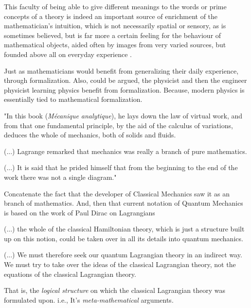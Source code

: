 \documentclass[
12pt,				%
openright,			%
oneside,			%
a4paper,			%
brazil,				%
english,			%
]{abntex2}
\begin{document}
\begin{citacao}
 This faculty of being able to give
 different meanings to the words or prime concepts of a theory is indeed an
 important source of enrichment of the mathematician's intuition, which is
 not necessarily spatial or sensory, as is sometimes believed, but is far more
 a certain feeling for the behaviour of mathematical objects, aided often
 by images from very varied sources, but founded above all on everyday
 experience \cite{bourbaki2004theory}.
\end{citacao}

Just as mathematicians would benefit from generalizing their daily
experience, through formalization. Also, could be argued, the
physicist and then the engineer physicist learning physics benefit
from formalization. Because, modern physics is essentially tied to
mathematical formalization.

\begin{citacao}
"In this book (\textit{Mécanique analytique}), he lays down the law of
virtual work, and from that one fundamental principle, by the aid of
the calculus of variations, deduces the whole of mechanics, both of solids and fluids.

(...) Lagrange remarked that mechanics was really a branch of pure mathematics.

(...) It is said that he prided himself that from the beginning to the
end of the work there was not a single diagram." \cite{panza2003origins}
\end{citacao}

Concatenate the fact that the developer of Classical Mechanics saw it
as an branch of mathematics. And, then that current notation of
Quantum Mechanics is based on the work of Paul Dirac on Lagrangians\cite{dirac2005lagrangian}

\begin{citacao}
(...) the whole of the classical Hamiltonian theory, which is just a structure built up on this notion, could be taken over in all its details into quantum mechanics.
  
(...) We must therefore seek our quantum Lagrangian theory in an
indirect way. We must try to take over the ideas of the classical
Lagrangian theory, not the equations of the classical Lagrangian
theory. \cite{dirac2005lagrangian}
\end{citacao}

That is, the \textit{logical structure} on which the classical
Lagrangian theory was formulated upon. i.e., It's \textit{meta-mathematical} arguments.
\end{document}

